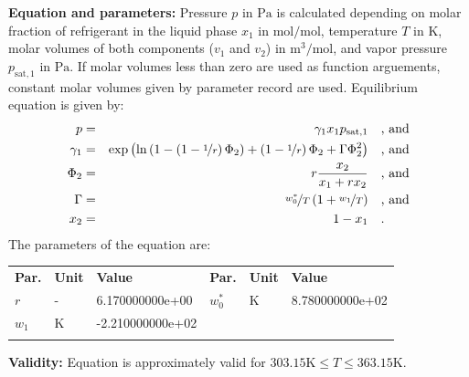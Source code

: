 \textbf{Equation and parameters:}
\newline
%
Pressure $p$ in $\si{\pascal}$ is calculated depending on molar fraction of refrigerant in the liquid phase $x_1$ in $\si{\mole\per\mole}$, temperature $T$ in $\si{\kelvin}$, molar volumes of both components ($v_1$ and $v_2$) in $\si{\cubic\meter\per\mole}$, and vapor pressure $p_\mathrm{sat,1}$ in $\si{\pascal}$. If molar volumes less than zero are used as function arguements, constant molar volumes given by parameter record are used. Equilibrium equation is given by:
%
\begin{equation*}
\begin{split}
p &=& \gamma_1 x_1 p_\mathrm{sat,1} & \quad\text{, and} \\
\gamma_1 &=& \exp \left( \ln \left( 1 - \left( 1 - \nicefrac{1}{r} \right) \Phi_2  \right) + \left(1 - \nicefrac{1}{r}\right) \Phi_2 + \Gamma \Phi_2 ^2 \right) & \quad\text{, and} \\
\Phi_2 &=& r \frac{x_2}{x_1 + r x_2} & \quad\text{, and} \\
\Gamma &=& \nicefrac{w_0^{*}}{T} \left( 1 + \nicefrac{w_1}{T} \right) & \quad\text{, and} \\
x_2 &=& 1 - x_1  & \quad\text{.} \\
\end{split}
\end{equation*}
%
The parameters of the equation are:
%
\begin{longtable}[l]{lll|lll}
\toprule
\addlinespace
\textbf{Par.} & \textbf{Unit} & \textbf{Value} &	\textbf{Par.} & \textbf{Unit} & \textbf{Value} \\
\addlinespace
\midrule
\endhead

\bottomrule
\endfoot
\bottomrule
\endlastfoot
\addlinespace

$r$ & - & 6.170000000e+00 & $w_0^{*}$ & $\si{\kelvin}$ & 8.780000000e+02 \\
$w_1$ & $\si{\kelvin}$ & -2.210000000e+02 & & & \\

\addlinespace\end{longtable}

\textbf{Validity:}
\newline
Equation is approximately valid for $303.15 \si{\kelvin} \leq T \leq 363.15 \si{\kelvin}$.
\newline

